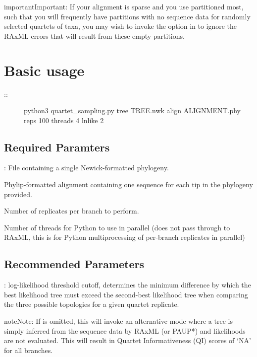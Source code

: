 \documentclass[letterpaper,12pt,english]{sphinxmanual}
\begin{document}
\begin{sphinxadmonition}{important}{Important:}
If your alignment is sparse and you use partitioned most, such that you will frequently have partitions with no sequence data for randomly selected quartets of taxa, you may wish to invoke the  option in  to ignore the RAxML errors that will result from these empty partitions.
\end{sphinxadmonition}


\section{Basic usage}
\label{\detokenize{intro:basic-usage}}\begin{description}
\item[{::}] \leavevmode
python3 quartet\_sampling.py \textendash{}tree TREE.nwk \textendash{}align ALIGNMENT.phy \textendash{}reps 100 \textendash{}threads 4 \textendash{}lnlike 2

\end{description}


\subsection{Required Paramters}
\label{\detokenize{intro:required-paramters}}
: File containing a single Newick-formatted phylogeny.

 Phylip-formatted alignment containing one sequence for each tip in the phylogeny provided.

 Number of replicates per branch to perform.

 Number of threads for Python to use in parallel (does not pass through to RAxML, this is for Python multiprocessing of per-branch replicates in parallel)


\subsection{Recommended Parameters}
\label{\detokenize{intro:recommended-parameters}}
: log-likelihood threshold cutoff, determines the minimum difference by which the best likelihood tree must exceed the second-best likelihood tree when comparing the three possible topologies for a given quartet replicate.

\begin{sphinxadmonition}{note}{Note:}
If  is omitted, this will invoke an alternative mode where a tree is simply inferred from the sequence data by RAxML (or PAUP*) and likelihoods are not evaluated.  This will result in Quartet Informativeness (QI) scores of ‘NA’ for all branches.
\end{sphinxadmonition}
\end{document}
